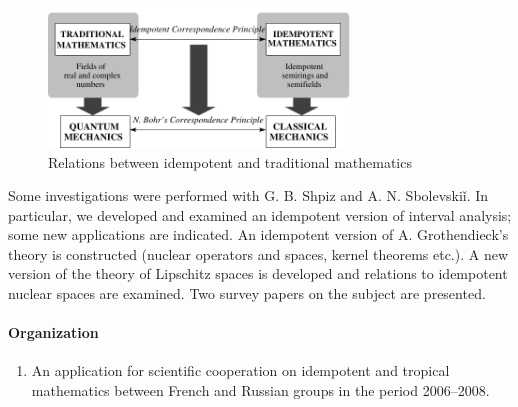 \begin{figure}[ht]
  \begin{center}
    \includegraphics[width=8cm]{Litvinov/Litvinov.pdf}
    \caption{Relations between idempotent and traditional mathematics}
    \label{q:xxx}
  \end{center}
\end{figure}


Some investigations were performed with G. B. Shpiz and
A. N. Sbolevski\v i. In particular, we developed and examined
an idempotent version of interval analysis; some new
applications are indicated. An idempotent version
of A. Grothendieck's theory is constructed (nuclear
operators and spaces, kernel theorems etc.).
A new version of the theory of Lipschitz spaces is
developed and relations to idempotent nuclear spaces are
examined. Two survey papers on the subject are
presented.



\paragraph{Organization}

\begin{enumerate}
\item   An application for scientific cooperation on
idempotent and tropical mathematics between French
and Russian groups in the period 2006--2008.
\end{enumerate}

